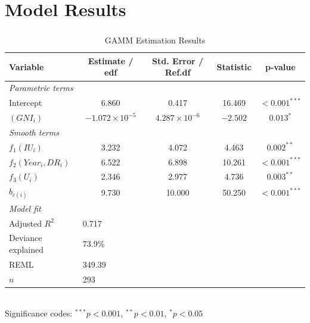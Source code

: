 \section{Model Results}
\subsubsection{}
\begin{table}[H]
\centering
\caption{GAMM Estimation Results}
\begin{tabular}{|l|c|c|c|c|}
\hline
\textbf{Variable} & \textbf{Estimate / edf} & \textbf{Std. Error / Ref.df} & \textbf{Statistic} & \textbf{p-value} \\
\hline\hline
\multicolumn{5}{|l|}{\textit{Parametric terms}} \\
\hline
Intercept & 6.860 & 0.417 & 16.469 & $<0.001^{***}$ \\
$(GNI_i)$ & $-1.072 \times 10^{-5}$ & $4.287 \times 10^{-6}$ & $-2.502$ & $0.013^{*}$ \\
\hline\hline
\multicolumn{5}{|l|}{\textit{Smooth terms}} \\
\hline
$f_1(IU_i)$ & 3.232 & 4.072 & 4.463 & $0.002^{**}$ \\
$f_2(Year_i,DR_i)$ & 6.522 & 6.898 & 10.261 & $<0.001^{***}$ \\
$f_3(U_i)$ & 2.346 & 2.977 & 4.736 & $0.003^{**}$ \\
$b_{c(i)}$ & 9.730 & 10.000 & 50.250 & $<0.001^{***}$ \\
\hline\hline
\multicolumn{5}{|l|}{\textit{Model fit}} \\
\hline
Adjusted $R^2$ & \multicolumn{4}{l|}{0.717} \\
Deviance explained & \multicolumn{4}{l|}{73.9\%} \\
REML & \multicolumn{4}{l|}{349.39} \\
$n$ & \multicolumn{4}{l|}{293} \\
\hline
\end{tabular}
\\[0.5em]
\small Significance codes: $^{***}p<0.001$, $^{**}p<0.01$, $^{*}p<0.05$
\end{table}

